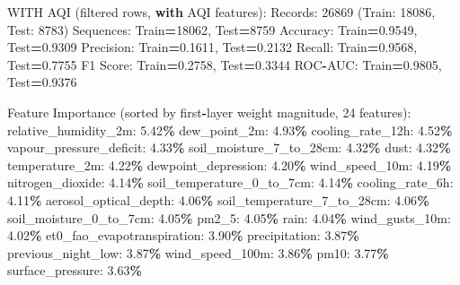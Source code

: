 \documentclass[
  letterpaper,
  DIV=11,
  numbers=noendperiod]{scrartcl}
\newenvironment{Shaded}{\begin{snugshade}}{\end{snugshade}}
\newcommand{\BuiltInTok}[1]{#1}
\newcommand{\ControlFlowTok}[1]{\textcolor[rgb]{0.13,0.29,0.53}{\textbf{#1}}}
\newcommand{\DecValTok}[1]{\textcolor[rgb]{0.00,0.00,0.81}{#1}}
\newcommand{\FloatTok}[1]{\textcolor[rgb]{0.00,0.00,0.81}{#1}}
\newcommand{\NormalTok}[1]{#1}
\newcommand{\OperatorTok}[1]{\textcolor[rgb]{0.81,0.36,0.00}{\textbf{#1}}}
\begin{document}
\begin{Shaded}
\begin{Highlighting}[]
\NormalTok{WITH AQI (filtered rows, }\ControlFlowTok{with}\NormalTok{ AQI features):}
\NormalTok{  Records: }\DecValTok{26869}\NormalTok{ (Train: }\DecValTok{18086}\NormalTok{, Test: }\DecValTok{8783}\NormalTok{)}
\NormalTok{  Sequences: Train}\OperatorTok{=}\DecValTok{18062}\NormalTok{, Test}\OperatorTok{=}\DecValTok{8759}
\NormalTok{  Accuracy: Train}\OperatorTok{=}\FloatTok{0.9549}\NormalTok{, Test}\OperatorTok{=}\FloatTok{0.9309}
\NormalTok{  Precision: Train}\OperatorTok{=}\FloatTok{0.1611}\NormalTok{, Test}\OperatorTok{=}\FloatTok{0.2132}
\NormalTok{  Recall: Train}\OperatorTok{=}\FloatTok{0.9568}\NormalTok{, Test}\OperatorTok{=}\FloatTok{0.7755}
\NormalTok{  F1 Score: Train}\OperatorTok{=}\FloatTok{0.2758}\NormalTok{, Test}\OperatorTok{=}\FloatTok{0.3344}
\NormalTok{  ROC}\OperatorTok{{-}}\NormalTok{AUC: Train}\OperatorTok{=}\FloatTok{0.9805}\NormalTok{, Test}\OperatorTok{=}\FloatTok{0.9376}

\NormalTok{  Feature Importance (}\BuiltInTok{sorted}\NormalTok{ by first}\OperatorTok{{-}}\NormalTok{layer weight magnitude, }\DecValTok{24}\NormalTok{ features):}
\NormalTok{    relative\_humidity\_2m: }\FloatTok{5.42}\OperatorTok{\%}
\NormalTok{    dew\_point\_2m: }\FloatTok{4.93}\OperatorTok{\%}
\NormalTok{    cooling\_rate\_12h: }\FloatTok{4.52}\OperatorTok{\%}
\NormalTok{    vapour\_pressure\_deficit: }\FloatTok{4.33}\OperatorTok{\%}
\NormalTok{    soil\_moisture\_7\_to\_28cm: }\FloatTok{4.32}\OperatorTok{\%}
\NormalTok{    dust: }\FloatTok{4.32}\OperatorTok{\%}
\NormalTok{    temperature\_2m: }\FloatTok{4.22}\OperatorTok{\%}
\NormalTok{    dewpoint\_depression: }\FloatTok{4.20}\OperatorTok{\%}
\NormalTok{    wind\_speed\_10m: }\FloatTok{4.19}\OperatorTok{\%}
\NormalTok{    nitrogen\_dioxide: }\FloatTok{4.14}\OperatorTok{\%}
\NormalTok{    soil\_temperature\_0\_to\_7cm: }\FloatTok{4.14}\OperatorTok{\%}
\NormalTok{    cooling\_rate\_6h: }\FloatTok{4.11}\OperatorTok{\%}
\NormalTok{    aerosol\_optical\_depth: }\FloatTok{4.06}\OperatorTok{\%}
\NormalTok{    soil\_temperature\_7\_to\_28cm: }\FloatTok{4.06}\OperatorTok{\%}
\NormalTok{    soil\_moisture\_0\_to\_7cm: }\FloatTok{4.05}\OperatorTok{\%}
\NormalTok{    pm2\_5: }\FloatTok{4.05}\OperatorTok{\%}
\NormalTok{    rain: }\FloatTok{4.04}\OperatorTok{\%}
\NormalTok{    wind\_gusts\_10m: }\FloatTok{4.02}\OperatorTok{\%}
\NormalTok{    et0\_fao\_evapotranspiration: }\FloatTok{3.90}\OperatorTok{\%}
\NormalTok{    precipitation: }\FloatTok{3.87}\OperatorTok{\%}
\NormalTok{    previous\_night\_low: }\FloatTok{3.87}\OperatorTok{\%}
\NormalTok{    wind\_speed\_100m: }\FloatTok{3.86}\OperatorTok{\%}
\NormalTok{    pm10: }\FloatTok{3.77}\OperatorTok{\%}
\NormalTok{    surface\_pressure: }\FloatTok{3.63}\OperatorTok{\%}


\end{Highlighting}
\end{Shaded}
\end{document}
